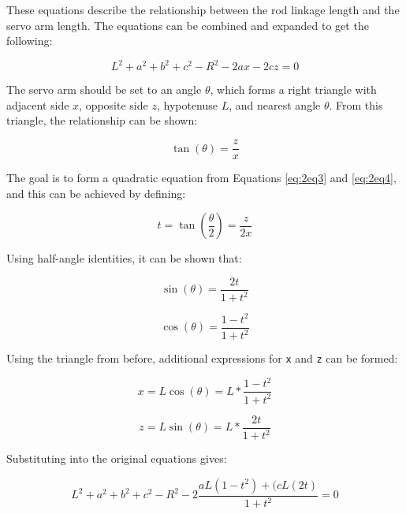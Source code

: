 \documentclass[12pt,a4paper]{report}
\begin{document}
These equations describe the relationship between the rod linkage length and the servo arm length. The equations can be combined and expanded to get the following:

\begin{equation}\label{eq:2eq3}
	L^2 + a^2 + b^2 + c^2 - R^2 - 2ax - 2cz = 0
\end{equation}

The servo arm should be set to an angle $\theta$, which forms a right triangle with adjacent side \(x\), opposite side \(z\), hypotenuse \(L\), and nearest angle $\theta$. From this triangle, the relationship can be shown:

\begin{equation}\label{eq:2eq4}
	\tan(\theta) = \frac{z}{x}
\end{equation}

The goal is to form a quadratic equation from Equations \ref{eq:2eq3} and \ref{eq:2eq4}, and this can be achieved by defining:

\begin{equation}\label{eq:2eq5}
	t = \tan( \frac{\theta}{2} ) = \frac{z}{2x}
\end{equation}

Using half-angle identities, it can be shown that:

\begin{equation}\label{eq:2eq6}
	\sin(\theta) = \frac{2t}{1+t^2}
\end{equation}

\begin{equation}\label{eq:2eq7}
	\cos(\theta) = \frac{1-t^2}{1+t^2}
\end{equation}

Using the triangle from before, additional expressions for \verb|x| and \verb|z| can be formed:

\begin{equation}\label{eq:2eq8}
	x = L\cos(\theta) = L*\frac{1-t^2}{1+t^2}
\end{equation}

\begin{equation}\label{eq:2eq9}
	z = L\sin(\theta) = L*\frac{2t}{1+t^2}
\end{equation}

Substituting into the original equations gives:

\begin{equation}\label{eq:2eq10}
	L^2 + a^2 + b^2 + c^2 - R^2 - 2 \frac{aL(1-t^2) + (cL(2t)}{1+t^2} = 0
\end{equation}
\end{document}
